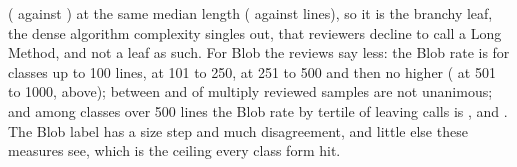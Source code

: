 \documentclass[11pt,a4paper]{article}
\begin{document}
(\revFlaggedLeafRate{} against \revFlaggedRestRate{}) at the same median
length (\revFlaggedLeafMedianLen{} against \revFlaggedRestMedianLen{}
lines), so it is the branchy leaf, the dense algorithm complexity singles
out, that reviewers decline to call a Long Method, and not a leaf as such.
For Blob the reviews say less: the Blob rate is \revBlobHundredRate{} for
classes up to 100 lines, \revBlobTwoFiftyRate{} at 101 to 250,
\revBlobFiveHundredRate{} at 251 to 500 and then no higher
(\revBlobThousandRate{} at 501 to 1000, \revBlobOverRate{} above);
between \revBlobHundredDisagree{} and \revBlobTwoFiftyDisagree{} of
multiply reviewed samples are not unanimous; and among classes over 500
lines the Blob rate by tertile of leaving calls is
\revBlobLargeCallsLowRate{}, \revBlobLargeCallsMidRate{} and
\revBlobLargeCallsHighRate{}. The Blob label has a size step and much
disagreement, and little else these measures see, which is the ceiling
every class form hit.
\end{document}
